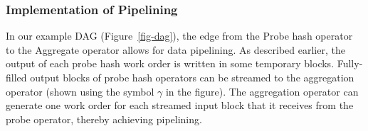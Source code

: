
\subsubsection{Implementation of Pipelining}


In our example DAG (Figure~\ref{fig-dag}), the edge from the Probe hash operator to the Aggregate operator allows for data pipelining.
As described earlier, the output of each probe hash work order is written in some temporary blocks.
Fully-filled output blocks of probe hash operators can be streamed to the aggregation operator (shown using the symbol $\gamma$ in the figure).
The aggregation operator can generate one work order for each streamed input block that it receives from the probe operator, thereby achieving pipelining.

